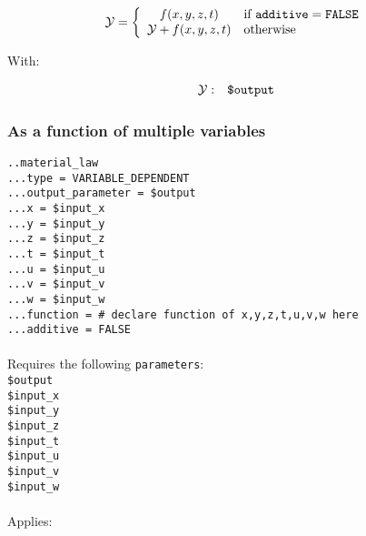 \documentclass[10pt]{article}
\begin{document}
\begin{equation}
	\mathcal{Y} = \left\{ \begin{array}{cl} f(x,y,z,t) & \text{if }\verb+additive+ = \verb+FALSE+  \\ \mathcal{Y} +f(x,y,z,t) & \text{otherwise} \end{array} \right.
\end{equation}

With:

\begin{eqnarray}
	\mathcal{Y} & : & \verb+$output+ \notag
\end{eqnarray}

\subsubsection{As a function of multiple variables}

\noindent \verb+..material_law+\\
\verb+...type = VARIABLE_DEPENDENT+\\
\verb+...output_parameter = $output+\\
\verb+...x = $input_x+\\
\verb+...y = $input_y+\\
\verb+...z = $input_z+\\
\verb+...t = $input_t+\\
\verb+...u = $input_u+\\
\verb+...v = $input_v+\\
\verb+...w = $input_w+\\
\verb+...function = # declare function of x,y,z,t,u,v,w here+\\
\verb+...additive = FALSE+

\paragraph{}Requires the following \verb+parameters+:\\

\noindent \verb+$output+\\
\verb+$input_x+\\
\verb+$input_y+\\
\verb+$input_z+\\
\verb+$input_t+\\
\verb+$input_u+\\
\verb+$input_v+\\
\verb+$input_w+

\paragraph{}Applies:
\end{document}
